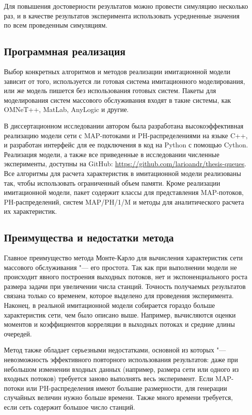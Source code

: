 Для повышения достоверности результатов можно провести симуляцию несколько раз, и в качестве результатов эксперимента использовать усредненные значения по всем проведенным симуляциям.



\subsection{Программная реализация}

Выбор конкретных алгоритмов и методов реализации имитационной модели зависит от того, используется ли готовая система имитационного моделирования, или же модель пишется без использования готовых систем. Пакеты для моделирования систем массового обслуживания входят в такие системы, как OMNeT++, MatLab, AnyLogic и другие.

В диссертационном исследовании автором была разработана высокоэффективная реализацию модели сети с MAP-потоками и PH-распределениями на языке C++, и разработан интерфейс для ее подключения в код на Python с помощью Cython. Реализация модели, а также все приведенные в исследовании численные эксперименты, доступны на GitHub: \url{https://github.com/larioandr/thesis-queues}. Все алгоритмы для расчета характеристик в имитационной модели реализованы так, чтобы использовать ограниченный объем памяти. Кроме реализации имитационной модели, пакет содержит классы для представления MAP-потоков, PH-распределений, систем MAP/PH/1/M и методы для аналитического расчета их характеристик.


\subsection{Преимущества и недостатки метода}
Главное преимущество метода Монте-Карло для вычисления характеристик сети массового обслуживания "--- его простота. Так как при выполнении модели не происходит явного построения выходных потоков, нет и экспоненциального роста размера задачи при увеличении числа станций. Точность получаемых результатов связана только со временем, которое выделено для проведения эксперимента. Наконец, в реальной имитационной модели собирается гораздо больше характеристик сети, чем было описано выше. Например, вычисляются оценки моментов и коэффициентов корреляции в выходных потоках и средние длины очередей.

Метод также обладает серьезными недостатками, основной из которых "--- невозможность эффективного повторного использования результатов: даже при небольшом изменении входных данных (например, размера сети или одного из входных потоков) требуется заново выполнять весь эксперимент. Если MAP-потоки или PH-распределения имеют большие размерности, для генерации случайных величин нужно больше времени. Также много времени требуется, если сеть содержит большое число станций.

